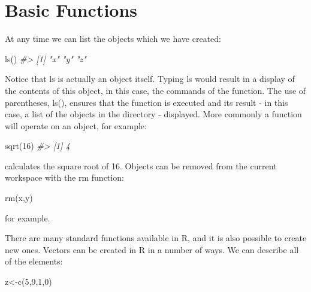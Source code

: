 \documentclass[
]{book}
\newenvironment{Shaded}{\begin{snugshade}}{\end{snugshade}}
\newcommand{\CommentTok}[1]{\textcolor[rgb]{0.56,0.35,0.01}{\textit{#1}}}
\newcommand{\DecValTok}[1]{\textcolor[rgb]{0.00,0.00,0.81}{#1}}
\newcommand{\FunctionTok}[1]{\textcolor[rgb]{0.00,0.00,0.00}{#1}}
\newcommand{\NormalTok}[1]{#1}
\newcommand{\OtherTok}[1]{\textcolor[rgb]{0.56,0.35,0.01}{#1}}
\begin{document}
\hypertarget{basic-functions}{%
\section{Basic Functions}\label{basic-functions}}

At any time we can list the objects which we have created:

\begin{Shaded}
\begin{Highlighting}[]
\FunctionTok{ls}\NormalTok{()}
\CommentTok{\#\textgreater{} [1] "x" "y" "z"}
\end{Highlighting}
\end{Shaded}

Notice that ls is actually an object itself. Typing ls would result in a display of the contents of
this object, in this case, the commands of the function. The use of parentheses, ls(), ensures that
the function is executed and its result - in this case, a list of the objects in the directory - displayed.
More commonly a function will operate on an object, for example:

\begin{Shaded}
\begin{Highlighting}[]
\FunctionTok{sqrt}\NormalTok{(}\DecValTok{16}\NormalTok{)}
\CommentTok{\#\textgreater{} [1] 4}
\end{Highlighting}
\end{Shaded}

calculates the square root of 16. Objects can be removed from the current workspace with the rm
function:

\begin{Shaded}
\begin{Highlighting}[]
\FunctionTok{rm}\NormalTok{(x,y)}
\end{Highlighting}
\end{Shaded}

for example.

There are many standard functions available in R, and it is also possible to create new ones.
Vectors can be created in R in a number of ways. We can describe all of the elements:

\begin{Shaded}
\begin{Highlighting}[]
\NormalTok{z}\OtherTok{\textless{}{-}}\FunctionTok{c}\NormalTok{(}\DecValTok{5}\NormalTok{,}\DecValTok{9}\NormalTok{,}\DecValTok{1}\NormalTok{,}\DecValTok{0}\NormalTok{)}
\end{Highlighting}
\end{Shaded}
\end{document}
